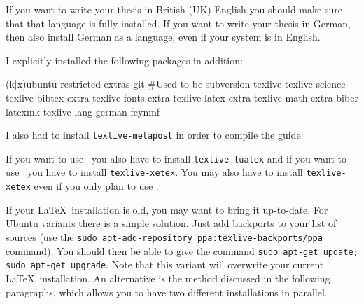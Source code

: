 If you want to write your thesis in British (UK) English you should make sure
that that language is fully installed. If you want to write your
thesis in German, then also install German as a language, even if
your system is in English.

I explicitly installed the following packages in addition:
\begin{bashlisting}
(k|x)ubuntu-restricted-extras
git #Used to be subversion
texlive
texlive-science
texlive-bibtex-extra
texlive-fonts-extra
texlive-latex-extra
texlive-math-extra
biber
latexmk
texlive-lang-german
feynmf
\end{bashlisting}
I also had to install \texttt{texlive-metapost} in order to compile the guide.

If you want to use \LuaLaTeX\ you also have to install \texttt{texlive-luatex}
and if you want to use \XeLaTeX\ you have to install \texttt{texlive-xetex}.
You may also have to install \texttt{texlive-xetex} even if you only plan to use \XeLaTeX.


If your \LaTeX\ installation is old, you may want to bring it
up-to-date.  For Ubuntu variants there is a simple solution. Just add
\TeXLive backports to your list of sources (use the \texttt{sudo
  apt-add-repository ppa:texlive-backports/ppa} command). You should
then be able to give the command \texttt{sudo apt-get update; sudo
  apt-get upgrade}. Note that this variant will overwrite your current
\LaTeX\ installation. An alternative is the method discussed in the
following paragraphs, which allows you to have two different installations in
parallel.


